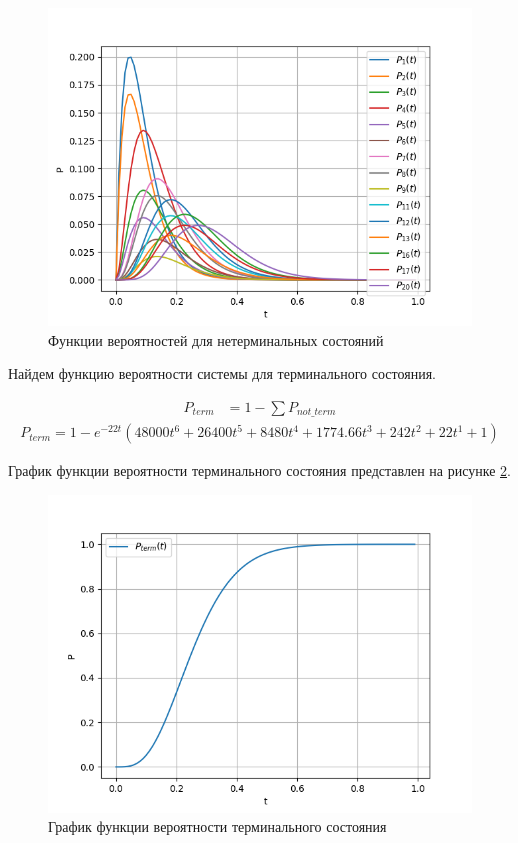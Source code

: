 \begin{figure}[H]
\centerline{\includegraphics[scale = 0.8]{Images/graph.png}}
\caption{Функции вероятностей для нетерминальных состояний}
\label{P_i}
\end{figure}

Найдем функцию вероятности системы для терминального состояния.

\begin{align*}
    P_{term}&=1 - \sum P_{not\_term}
\end{align*}
\begin{equation}
    \begin{aligned}
    P_{term} = 1 - e^{-22 t} ( 48000t^6 + 26400t^5 + 8480t^4 + 1774.66t^3 + 242t^2 + 22t^1 + 1 )
    \end{aligned}
\end{equation}

График функции вероятности терминального состояния представлен на рисунке \ref{Term_t}.

\begin{figure}[H]
\centerline{\includegraphics[scale = .8]{Images/Term_t.png}}
\caption{График функции вероятности терминального состояния}
\label{Term_t}
\end{figure}

